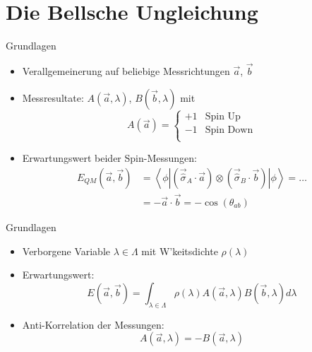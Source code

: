 \documentclass{beamer}
\begin{document}
\section{Die Bellsche Ungleichung}
\begin{frame}{Grundlagen}
    \begin{itemize}
        \item Verallgemeinerung auf beliebige Messrichtungen $\vec{a}$, $\vec{b}$
        \item Messresultate: $A(\vec{a},\lambda)$, $B(\vec{b},\lambda)$ mit
                \[
                    A(\vec{a}) = \begin{cases}
                        +1 & \text{Spin Up} \\
                        -1 & \text{Spin Down} \\
                    \end{cases}
                \]
        \item Erwartungswert beider Spin-Messungen:
                \begin{align*}
                    E_{QM}(\vec{a},\vec{b})
                    &= \left\langle \phi \left| 
                    \left( \vec{\hat{\sigma}}_A \cdot \vec{a} \right)
                            \otimes \left( \vec{\hat{\sigma}}_B \cdot \vec{b} \right)
                    \right| \phi \right\rangle
                    = \dots \\
                    &= - \vec{a} \cdot \vec{b} = - \cos(\theta_{ab})
                \end{align*}
    \end{itemize}
\end{frame}
\begin{frame}{Grundlagen}
    \begin{itemize}
        \item Verborgene Variable $\lambda \in \Lambda$ mit W'keitsdichte $\rho(\lambda)$
        \item Erwartungswert:
            \[
                E(\vec{a},\vec{b}) = \int_{\lambda\in\Lambda} 
                    \rho(\lambda) A(\vec{a},\lambda) B(\vec{b},\lambda) d\lambda
            \]
        \item<2-> Anti-Korrelation der Messungen:
            \[
                A(\vec{a},\lambda) = -B(\vec{a},\lambda)
            \]
    \end{itemize}
\end{frame}
\end{document}
